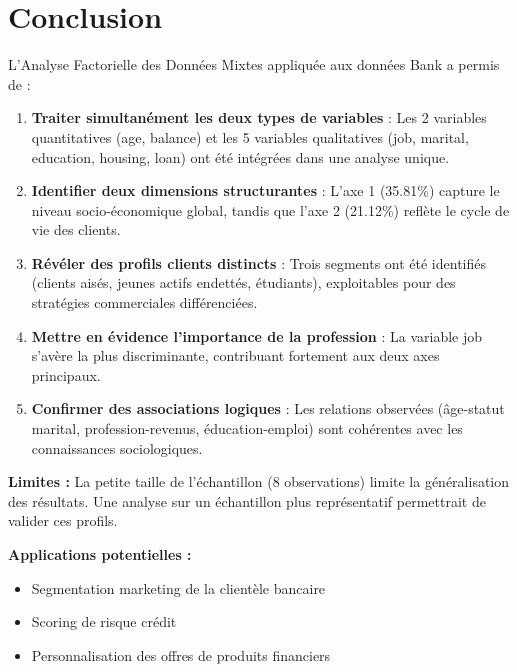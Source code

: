 \documentclass[12pt,a4paper]{article}
\begin{document}
\section{Conclusion}

L'Analyse Factorielle des Données Mixtes appliquée aux données Bank a permis de :

\begin{enumerate}
    \item \textbf{Traiter simultanément les deux types de variables} : Les 2 variables quantitatives (age, balance) et les 5 variables qualitatives (job, marital, education, housing, loan) ont été intégrées dans une analyse unique.
    
    \item \textbf{Identifier deux dimensions structurantes} : L'axe 1 (35.81\%) capture le niveau socio-économique global, tandis que l'axe 2 (21.12\%) reflète le cycle de vie des clients.
    
    \item \textbf{Révéler des profils clients distincts} : Trois segments ont été identifiés (clients aisés, jeunes actifs endettés, étudiants), exploitables pour des stratégies commerciales différenciées.
    
    \item \textbf{Mettre en évidence l'importance de la profession} : La variable job s'avère la plus discriminante, contribuant fortement aux deux axes principaux.
    
    \item \textbf{Confirmer des associations logiques} : Les relations observées (âge-statut marital, profession-revenus, éducation-emploi) sont cohérentes avec les connaissances sociologiques.
\end{enumerate}

\textbf{Limites :} La petite taille de l'échantillon (8 observations) limite la généralisation des résultats. Une analyse sur un échantillon plus représentatif permettrait de valider ces profils.

\textbf{Applications potentielles :}
\begin{itemize}
    \item Segmentation marketing de la clientèle bancaire
    \item Scoring de risque crédit
    \item Personnalisation des offres de produits financiers
\end{itemize}
\end{document}
